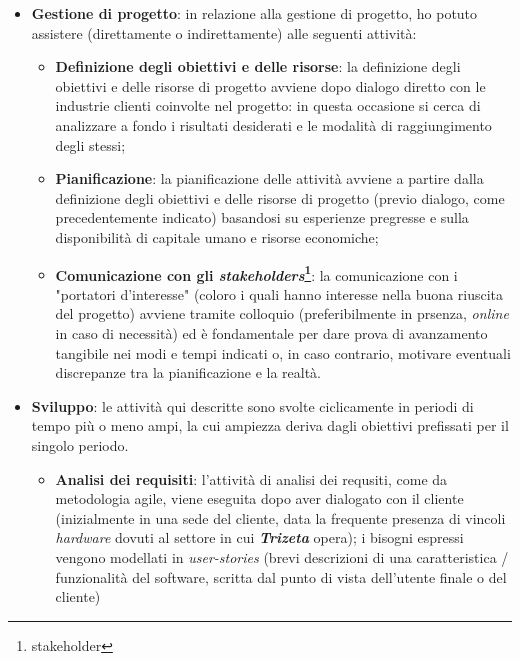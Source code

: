 \begin{itemize}
    \item \textbf{Gestione di progetto}: in relazione alla gestione di progetto, ho potuto assistere (direttamente o indirettamente) alle seguenti attività:
        \begin{itemize}
            \item \textbf{Definizione degli obiettivi e delle risorse}: la definizione degli obiettivi e delle risorse di progetto avviene dopo dialogo diretto con le industrie clienti coinvolte nel progetto: in questa occasione si cerca di analizzare a fondo 
                i risultati desiderati e le modalità di raggiungimento degli stessi;
            \item \textbf{Pianificazione}: la pianificazione delle attività avviene a partire dalla definizione degli obiettivi e delle risorse di progetto (previo dialogo, come precedentemente indicato) 
                basandosi su esperienze pregresse e sulla disponibilità di capitale umano e risorse economiche;
            \item \textbf{Comunicazione con gli \textit{stakeholders}\footnote{\gls{stakeholder}}}: la comunicazione con i "portatori d'interesse" (coloro i quali hanno interesse nella buona riuscita del progetto) avviene tramite colloquio (preferibilmente in prsenza, 
                \textit{online} in caso di necessità) ed è fondamentale per dare prova di avanzamento tangibile nei modi e tempi indicati o, in caso contrario, motivare eventuali discrepanze tra la pianificazione e la realtà.
        \end{itemize}
    \item \textbf{Sviluppo}: le attività qui descritte sono svolte ciclicamente in periodi di tempo più o meno ampi, la cui ampiezza deriva dagli obiettivi prefissati per il singolo periodo.
        \begin{itemize}
            \item \textbf{Analisi dei requisiti}: l'attività di analisi dei requsiti, come da metodologia agile, viene eseguita dopo aver dialogato con il cliente (inizialmente in una sede del cliente,
                data la frequente presenza di vincoli \textit{hardware} dovuti al settore in cui \textit{\textbf{Trizeta}} opera); i bisogni espressi vengono modellati in \textit{user-stories} (brevi descrizioni di una caratteristica / funzionalità del software, scritta dal punto di vista dell'utente finale o del cliente)

\end{itemize}
\end{itemize}
